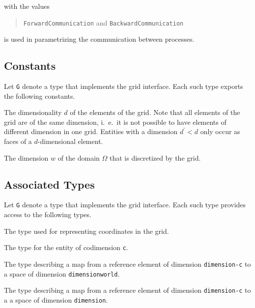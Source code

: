 \documentclass[11pt,a4paper,headinclude,footinclude,DIV14,BCOR8.25mm,titlepage,twoside,openright,normalheadings]{scrreprt}
\begin{document}
with the values
\begin{quote}
\raggedright
\lstinline!ForwardCommunication! and
\lstinline!BackwardCommunication!
\end{quote}
is used in parametrizing the communication between processes.

\subsection{Constants}

Let \lstinline!G! denote a type that implements the grid
interface. Each such type exports the following constants.

The dimensionality $d$ of the elements of the grid. Note that all elements
of the grid are of the same dimension, i.~e.~it is not possible to
have elements of different dimension in one grid. Entities with a
dimension $d^\prime<d$ only occur as faces of a $d$-dimensional element.

The dimension $w$ of the domain $\Omega$ that is discretized by the grid.

\subsection{Associated Types}

Let \lstinline!G! denote a type that implements the grid
interface. Each such type provides access to the following types.

The type used for representing coordinates in the grid.

The type for the entity of codimension \lstinline!c!.

The type describing a map from a reference element of dimension
\lstinline!dimension-c! to a space of dimension \lstinline!dimensionworld!.

The type describing a map from a reference element of dimension
\lstinline!dimension-c! to a a space of dimension \lstinline!dimension!.
\end{document}
